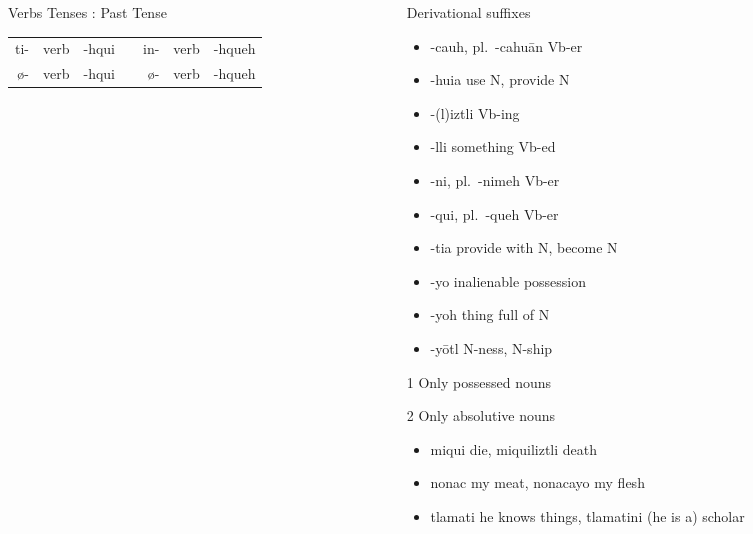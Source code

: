 \documentclass[12pt]{beamer}
\newcommand{\nah}[1]{\textcolor{nahgrn}{#1}}
\newcommand{\trs}[1]{\textcolor{nahblu}{#1}}
\begin{document}
\begin{frame}
\begin{columns}[t]
\begin{column}{.20\linewidth}
\begin{block}{Verbs Tenses : Past Tense}
\begin{enumerate}
\begin{tabular}[t]{rllcrll}
						\nah{ti-}   & verb & \trs{-hqui}   & \vline & \nah{in-}   & verb & \trs{-hqueh}  \\
						\nah{ø-}    & verb & \trs{-hqui}   & \vline & \nah{ø-}    & verb & \trs{-hqueh}  \\
					\end{tabular}%
				\end{enumerate}
			\end{block}
		\end{column}
		\begin{column}{.23\linewidth}
			\begin{block}{Derivational suffixes}
				\begin{threeparttable}
					\begin{itemize}
						\item \nah{-cauh}, pl.~\nah{-cahuān}  \trs{Vb-er}
						\item \nah{-huia} \trs{use N, provide N}
						\item \nah{-(l)iztli} \trs{Vb-ing}
						\item \nah{-lli} \trs{something Vb-ed}
						\item \nah{-ni}, pl.~\nah{-nimeh}  \trs{Vb-er}
						\item \nah{-qui}, pl.~\nah{-queh}  \trs{Vb-er}
						\item \nah{-tia} \trs{provide with N, become N}
						\item \nah{-yo} inalienable possession
						\item \nah{-yoh} \trs{thing full of N}
						\item \nah{-yōtl} \trs{N-ness, N-ship}
					\end{itemize}
					\begin{tablenotes}
						\item[1] Only possessed nouns
						\item[2] Only absolutive nouns
					\end{tablenotes}
				\end{threeparttable}
			\end{block}
			\begin{example}
				\begin{itemize}
					\item \nah{miqui} \trs{die}, \nah{miquiliztli} \trs{death}
					\item \nah{nonac} \trs{my meat}, \nah{nonacayo} \trs{my flesh}
					\item \nah{tlamati} \trs{he knows things}, \nah{tlamatini} \trs{(he is a) scholar}
				\end{itemize}

\end{example}
\end{column}
\end{columns}
\end{frame}
\end{document}
